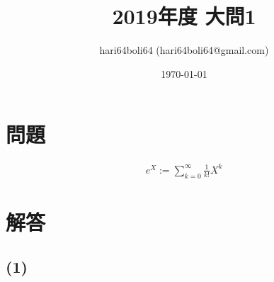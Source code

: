\documentclass[a4paper, 10pt, dvipdfmx]{jlreq}
\begin{document}
\title{2019年度 大問1}
\author{hari64boli64 (hari64boli64@gmail.com)}
\date{\today}
\maketitle


\section{問題}

\begin{align*}
  e^X:=\sum_{k=0}^\infty \frac{1}{k!}X^k
\end{align*}

\section{解答}

\subsection*{(1)}
\end{document}
